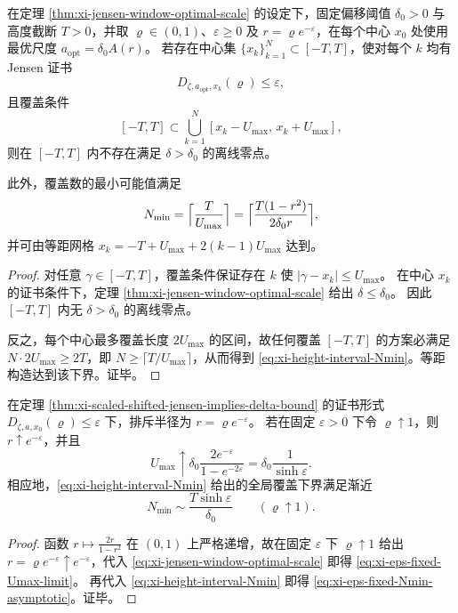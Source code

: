 \begin{corollary}[有限高度区间的最小采样复杂度与等距网格]\label{cor:xi-height-interval-minimal-sampling}
在定理 \ref{thm:xi-jensen-window-optimal-scale} 的设定下，固定偏移阈值 \(\delta_0>0\) 与高度截断 \(T>0\)，并取 \(\varrho\in(0,1)\)、\(\varepsilon\ge 0\) 及 \(r=\varrho e^{-\varepsilon}\)，在每个中心 \(x_0\) 处使用最优尺度 \(a_{\mathrm{opt}}=\delta_0A(r)\)。
若存在中心集 \(\{x_k\}_{k=1}^N\subset[-T,T]\)，使对每个 \(k\) 均有 Jensen 证书
\[
D_{\zeta,a_{\mathrm{opt}},x_k}(\varrho)\le \varepsilon,
\]
且覆盖条件
\[
[-T,T]\subset \bigcup_{k=1}^N [x_k-U_{\max},\,x_k+U_{\max}],
\]
则在 \([-T,T]\) 内不存在满足 \(\delta>\delta_0\) 的离线零点。

此外，覆盖数的最小可能值满足
\begin{equation}\label{eq:xi-height-interval-Nmin}
N_{\min}=\Bigl\lceil \frac{T}{U_{\max}}\Bigr\rceil
=\Bigl\lceil \frac{T(1-r^2)}{2\delta_0 r}\Bigr\rceil,
\end{equation}
并可由等距网格 \(x_k=-T+U_{\max}+2(k-1)U_{\max}\) 达到。
\end{corollary}
\begin{proof}
对任意 \(\gamma\in[-T,T]\)，覆盖条件保证存在 \(k\) 使 \(|\gamma-x_k|\le U_{\max}\)。
在中心 \(x_k\) 的证书条件下，定理 \ref{thm:xi-jensen-window-optimal-scale} 给出
\(\delta\le \delta_0\)。
因此 \([-T,T]\) 内无 \(\delta>\delta_0\) 的离线零点。

反之，每个中心最多覆盖长度 \(2U_{\max}\) 的区间，故任何覆盖 \([-T,T]\) 的方案必满足
\(N\cdot 2U_{\max}\ge 2T\)，即 \(N\ge \lceil T/U_{\max}\rceil\)，从而得到
\eqref{eq:xi-height-interval-Nmin}。等距构造达到该下界。证毕。
\end{proof}

\begin{corollary}[固定缺陷预算下的极限半径与复杂度闭式]\label{cor:xi-eps-fixed-radius-limit}
在定理 \ref{thm:xi-scaled-shifted-jensen-implies-delta-bound} 的证书形式
\(
D_{\zeta,a,x_0}(\varrho)\le \varepsilon
\)
下，排斥半径为 \(r=\varrho e^{-\varepsilon}\)。
若在固定 \(\varepsilon>0\) 下令 \(\varrho\uparrow 1\)，则 \(r\uparrow e^{-\varepsilon}\)，并且
\begin{equation}\label{eq:xi-eps-fixed-Umax-limit}
U_{\max}\uparrow
\delta_0\frac{2e^{-\varepsilon}}{1-e^{-2\varepsilon}}
=\delta_0\frac{1}{\sinh\varepsilon}.
\end{equation}
相应地，\eqref{eq:xi-height-interval-Nmin} 给出的全局覆盖下界满足渐近
\begin{equation}\label{eq:xi-eps-fixed-Nmin-asymptotic}
N_{\min}\sim \frac{T\sinh\varepsilon}{\delta_0}\qquad (\varrho\uparrow 1).
\end{equation}
\end{corollary}
\begin{proof}
函数 \(r\mapsto \frac{2r}{1-r^2}\) 在 \((0,1)\) 上严格递增，故在固定 \(\varepsilon\) 下
\(\varrho\uparrow 1\) 给出 \(r=\varrho e^{-\varepsilon}\uparrow e^{-\varepsilon}\)，代入
\eqref{eq:xi-jensen-window-optimal-scale} 即得 \eqref{eq:xi-eps-fixed-Umax-limit}。
再代入 \eqref{eq:xi-height-interval-Nmin} 即得 \eqref{eq:xi-eps-fixed-Nmin-asymptotic}。证毕。
\end{proof}

